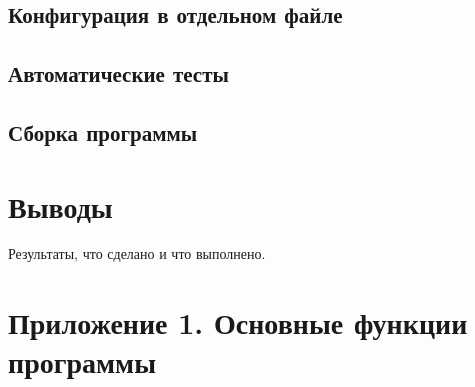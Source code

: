 \documentclass[a4paper,12pt]{report}
\begin{document}
\section{Конфигурация в отдельном файле}

\section{Автоматические тесты}

\section{Сборка программы}




\chapter*{Выводы}

Результаты, что сделано и что выполнено.


\cleardoublepage
{}
{}
\chapter*{Приложение 1. Основные функции программы}


% 
\end{document}
